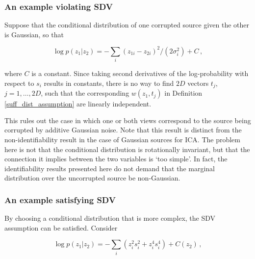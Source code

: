 
\subsubsection{An example violating SDV}

Suppose that the conditional distribution of one corrupted source given the other is Gaussian, so that

\begin{equation}
\log p(z_1|z_2) =  -\sum_i (z_{1i} - z_{2i})^2/(2\sigma_i^2) + C \,, \label{eq:unsatisfied}
\end{equation}

where $C$ is a constant.
Since taking second derivatives of the log-probability with respect to $s_i$ results in constants,
there is no way to find $2D$ vectors ${t}_j$, $j=1, \ldots, 2D$, such that the corresponding ${w}(z_1, t_j)$ in Definition \ref{suff_dist_assumption} are linearly independent.

This rules out the case in which one or both views correspond to the source being corrupted by additive Gaussian noise.
Note that this result is distinct from the non-identifiability result in the case of Gaussian sources for ICA.
The problem here is not that the conditional distribution is rotationally invariant, but that the connection it implies between the two variables is `too simple'.
In fact, the identifiability results presented here do not demand that the marginal distribution over the uncorrupted source be non-Gaussian.



\subsubsection{An example satisfying SDV}

By choosing a conditional distribution  that is more complex, the SDV assumption can be satisfied. Consider

\begin{equation}
\log p(z_1|z_2) =  - \sum_i (z_i^2  s_i^2 + z_i^4 s_i^4  ) + C(z_2) \,, \label{eq:satisfied}
\end{equation}

